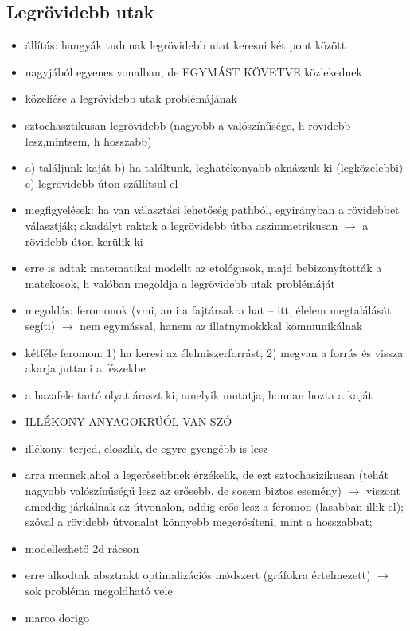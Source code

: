 \documentclass[a4paper, 11pt]{article}
\begin{document}
\subsection{Legrövidebb utak}

\begin{itemize}
	\item állítás: hangyák tudnnak legrövidebb utat keresni két pont között
	\item nagyjából egyenes vonalban, de EGYMÁST KÖVETVE közlekednek
	\item közelíése a legrövidebb utak problémájának
	\item sztochasztikusan legrövidebb (nagyobb a valószínűsége, h rövidebb lesz,mintsem, h hosszabb)
	\item a) találjunk kaját b) ha találtunk, leghatékonyabb aknázzuk ki (legközelebbi) c) legrövidebb úton szállítsul el
	\item megfigyelések: ha van választási lehetőség pathból, egyirányban a rövidebbet választják; akadályt raktak a legrövidebb útba aszimmetrikusan $\to$ a rövidebb úton kerülik ki
	\item erre is adtak matematikai modellt az etológusok, majd bebizonyították a matekosok, h valóban megoldja a legrövidebb utak problémáját
	\item megoldás: feromonok (vmi, ami a fajtársakra hat -- itt, élelem megtalálását segíti) $\to$ nem egymással, hanem az illatnymokkkal kommunikálnak
	\item kétféle feromon: 1) ha keresi az élelmiszerforrást; 2) megvan a forrás és vissza akarja juttani a fészekbe
	\item a hazafele tartó olyat áraszt ki, amelyik mutatja, honnan hozta a kaját
	\item ILLÉKONY ANYAGOKRÜÓL VAN SZÓ
	\item illékony: terjed, eloszlik, de egyre gyengébb is lesz
	\item arra mennek,ahol a legerősebbnek érzékelik, de ezt sztochasizikusan (tehát nagyobb valószínűségű lesz az erősebb, de sosem biztos esemény) $\to$ viszont ameddig járkálnak az útvonalon, addig erős lesz a feromon (lasabban illik el); szóval a rövidebb útvonalat könnyebb megerősíteni, mint a hosszabbat;
	\item modellezhető 2d rácson
	\item erre alkodtak absztrakt optimalizációs módszert (gráfokra értelmezett) $\to$ sok probléma megoldható vele
	\item marco dorigo
\end{itemize}
\end{document}
